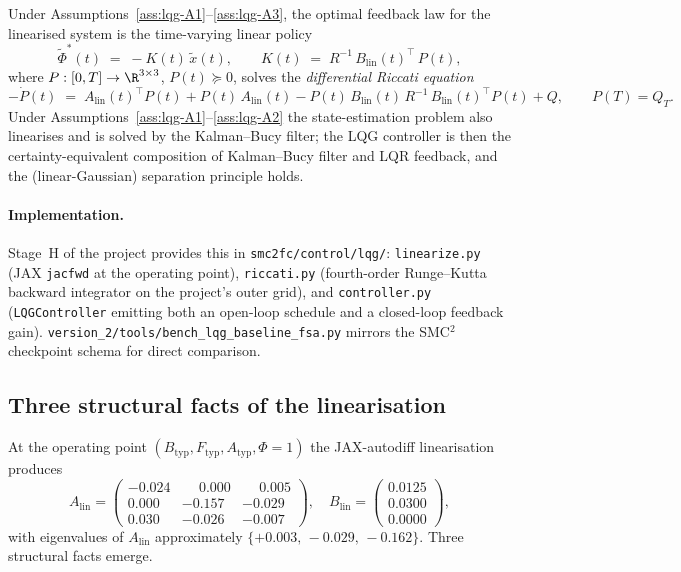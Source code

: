 Under Assumptions~\ref{ass:lqg-A1}--\ref{ass:lqg-A3}, the optimal
feedback law for the linearised system is the time-varying linear
policy
\begin{equation}
  \tilde \Phi^*(t) \;=\; -K(t)\,\tilde x(t),
  \qquad K(t) \;=\; R^{-1}\,B_{\mathrm{lin}}(t)^{\!\top}\,P(t),
  \label{eq:lqg-feedback}
\end{equation}
where $P:[0,T] \to \R^{3\times 3}$, $P(t) \succeq 0$, solves the
\emph{differential Riccati equation}
\begin{equation}
  -\dot P(t) \;=\; A_{\mathrm{lin}}(t)^{\!\top} P(t)
                   + P(t)\,A_{\mathrm{lin}}(t)
                   - P(t)\,B_{\mathrm{lin}}(t)\,R^{-1}\,
                     B_{\mathrm{lin}}(t)^{\!\top} P(t)
                   + Q,
  \qquad P(T) = Q_T.
  \label{eq:riccati}
\end{equation}
Under
Assumptions~\ref{ass:lqg-A1}--\ref{ass:lqg-A2} the state-estimation
problem also linearises and is solved by the Kalman--Bucy filter; the
LQG controller is then the certainty-equivalent composition of
Kalman--Bucy filter and LQR feedback, and the (linear-Gaussian)
separation principle holds.

\paragraph{Implementation.}
Stage~H of the project provides this in
\texttt{smc2fc/control/lqg/}: \texttt{linearize.py} (JAX
\texttt{jacfwd} at the operating point), \texttt{riccati.py}
(fourth-order Runge--Kutta backward integrator on the project's outer
grid), and \texttt{controller.py} (\texttt{LQGController} emitting
both an open-loop schedule and a closed-loop feedback gain).
\texttt{version\_2/tools/bench\_lqg\_baseline\_fsa.py} mirrors the
SMC${}^2$ checkpoint schema for direct comparison.

\subsection{Three structural facts of the linearisation}\label{app:lqg-facts}

At the operating point $(B_{\mathrm{typ}},F_{\mathrm{typ}},A_{\mathrm{typ}},\Phi=1)$
the JAX-autodiff linearisation produces
\begin{equation}
  A_{\mathrm{lin}} =
  \begin{pmatrix}
   -0.024 & \phantom{-}0.000 & \phantom{-}0.005 \\
    0.000 & -0.157 & -0.029 \\
    0.030 & -0.026 & -0.007
  \end{pmatrix},
  \quad
  B_{\mathrm{lin}} =
  \begin{pmatrix} 0.0125 \\ 0.0300 \\ 0.0000 \end{pmatrix},
  \label{eq:lqg-numbers}
\end{equation}
with eigenvalues of $A_{\mathrm{lin}}$ approximately
$\{+0.003,\,-0.029,\,-0.162\}$. Three structural facts emerge.

